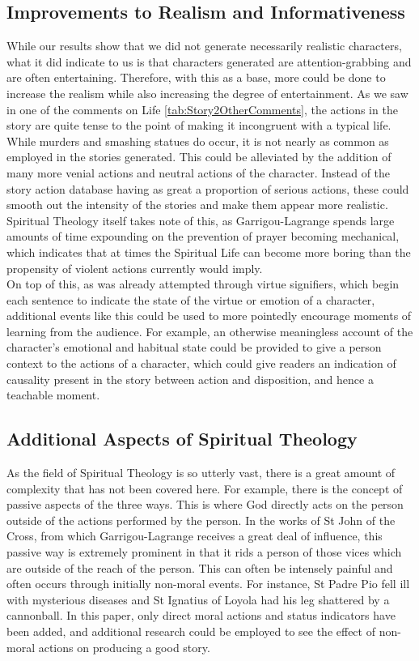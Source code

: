 \documentclass[11pt]{article}
\begin{document}
\subsection{Improvements to Realism and Informativeness}
While our results show that we did not generate necessarily realistic characters, what it did indicate to us is that characters generated are attention-grabbing and are often entertaining. Therefore, with this as a base, more could be done to increase the realism while also increasing the degree of entertainment. As we saw in one of the comments on Life \ref{tab:Story2OtherComments}, the actions in the story are quite tense to the point of making it incongruent with a typical life. While murders and smashing statues do occur, it is not nearly as common as employed in the stories generated. This could be alleviated by the addition of many more venial actions and neutral actions of the character. Instead of the story action database having as great a proportion of serious actions, these could smooth out the intensity of the stories and make them appear more realistic. Spiritual Theology itself takes note of this, as Garrigou-Lagrange spends large amounts of time expounding on the prevention of prayer becoming mechanical, which indicates that at times the Spiritual Life can become more boring\cite{garrigou2013three} than the propensity of violent actions currently would imply.\\
On top of this, as was already attempted through virtue signifiers, which begin each sentence to indicate the state of the virtue or emotion of a character, additional events like this could be used to more pointedly encourage moments of learning from the audience. For example, an otherwise meaningless account of the character's emotional and habitual state could be provided to give a person context to the actions of a character, which could give readers an indication of causality present in the story between action and disposition, and hence a teachable moment.\\

\subsection{Additional Aspects of Spiritual Theology}
As the field of Spiritual Theology is so utterly vast, there is a great amount of complexity that has not been covered here. For example, there is the concept of passive aspects of the three ways. This is where God directly acts on the person outside of the actions performed by the person. In the works of St John of the Cross, from which Garrigou-Lagrange receives a great deal of influence, this passive way is extremely prominent in that it rids a person of those vices which are outside of the reach of the person. This can often be intensely painful and often occurs through initially non-moral events. For instance, St Padre Pio fell ill with mysterious diseases \cite{allegri2000padre} and St Ignatius of Loyola had his leg shattered by a cannonball\cite{loyola2009autobiography}. In this paper, only direct moral actions and status indicators have been added, and additional research could be employed to see the effect of non-moral actions on producing a good story.\\
\end{document}
